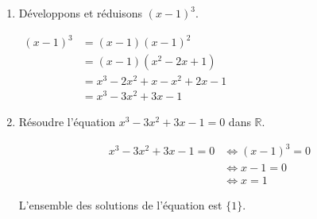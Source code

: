 \documentclass[a4paper,12pt]{report}
\begin{document}
\begin{enumerate}
\item Développons et réduisons $(x-1)^3$.

$\begin{aligned}
(x-1)^3 &= (x-1)(x-1)^2\\
			&=(x-1)(x^2-2x+1)\\
			&=x^3-2x^2+x-x^2+2x-1\\
			&=x^3-3x^2+3x-1
\end{aligned}$

\item Résoudre l'équation
$x^3-3x^2+3x-1=0$ dans
 $\mathbb{R}$.

\[\begin{aligned}
x^3-3x^2+3x-1=0 &\iff (x-1)^3=0\\
							  &\iff x-1=0\\
							  &\iff x=1
\end{aligned}\]

L'ensemble des solutions de
l'équation est $\{1\}$.
\end{enumerate}
\end{document}
